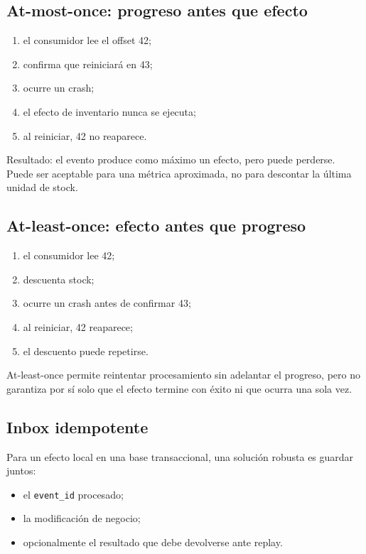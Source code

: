 \documentclass[variant=apuntes,cover=institutional,mode=screen]{ua-engineering-v6-article}
\begin{document}
\subsection{At-most-once: progreso antes que efecto}

\begin{enumerate}
\item el consumidor lee el offset 42;
\item confirma que reiniciará en 43;
\item ocurre un crash;
\item el efecto de inventario nunca se ejecuta;
\item al reiniciar, 42 no reaparece.
\end{enumerate}

Resultado: el evento produce como máximo un efecto, pero puede perderse. Puede ser aceptable para una métrica aproximada, no para descontar la última unidad de stock.

\subsection{At-least-once: efecto antes que progreso}

\begin{enumerate}
\item el consumidor lee 42;
\item descuenta stock;
\item ocurre un crash antes de confirmar 43;
\item al reiniciar, 42 reaparece;
\item el descuento puede repetirse.
\end{enumerate}

At-least-once permite reintentar procesamiento sin adelantar el progreso, pero no garantiza por sí solo que el efecto termine con éxito ni que ocurra una sola vez.

\subsection{Inbox idempotente}

Para un efecto local en una base transaccional, una solución robusta es guardar juntos:

\begin{itemize}
\item el \texttt{event\_id} procesado;
\item la modificación de negocio;
\item opcionalmente el resultado que debe devolverse ante replay.
\end{itemize}
\end{document}
